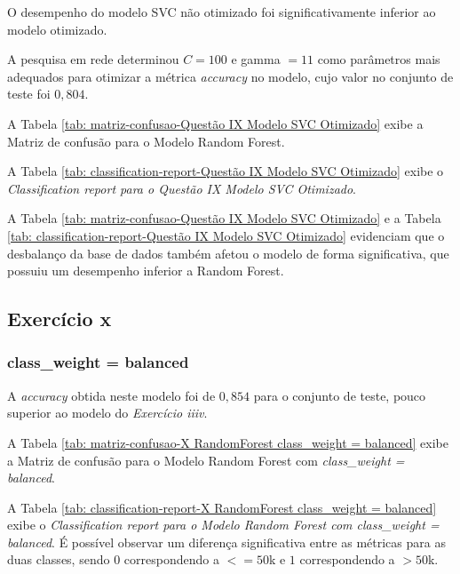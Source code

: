O desempenho do modelo SVC não otimizado foi significativamente inferior ao modelo otimizado.

A pesquisa em rede determinou $C = 100$ e gamma $ = 11$ como parâmetros mais adequados para otimizar a métrica \textit{accuracy} no modelo, cujo valor no conjunto de teste foi $0,804$. 

A Tabela \ref{tab: matriz-confusao-Questão IX Modelo SVC Otimizado} exibe a Matriz de confusão para o Modelo Random Forest.



A Tabela \ref{tab: classification-report-Questão IX Modelo SVC Otimizado} exibe o \textit{Classification report para o Questão IX Modelo SVC Otimizado}.



A Tabela \ref{tab: matriz-confusao-Questão IX Modelo SVC Otimizado} e a Tabela \ref{tab: classification-report-Questão IX Modelo SVC Otimizado} evidenciam que o desbalanço da base de dados também afetou o modelo de forma significativa, que possuiu um desempenho inferior a Random Forest.

\subsection{Exercício x}

\subsubsection{class\_weight = balanced}

A \textit{accuracy} obtida neste modelo foi de $0,854$ para o conjunto de teste, pouco superior ao modelo do \textit{Exercício iiiv}.

A Tabela \ref{tab: matriz-confusao-X RandomForest class_weight = balanced} exibe a Matriz de confusão para o Modelo Random Forest com \textit{class\_weight = balanced}.



A Tabela \ref{tab: classification-report-X RandomForest class_weight = balanced} exibe o \textit{Classification report para o Modelo Random Forest com class\_weight = balanced}. É possível observar um diferença significativa entre as métricas para as duas classes, sendo $0$ correspondendo a $<=50$k e $1$ correspondendo a $>50$k.

